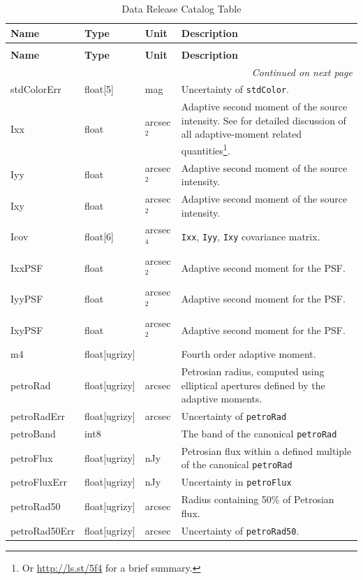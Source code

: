 \documentclass[SE,lsstdraft,toc]{lsstdoc}
\newenvironment{schema}[3]{%
\setlength\LTleft{0pt}
\setlength\LTright{\fill}
\begin{longtable}{p{0.2\textwidth}p{0.14\textwidth}p{0.14\textwidth}p{0.41\textwidth}}

\caption[#1]{#2\label{#3}}\\

\hline \textbf{Name} & \textbf{Type} & \textbf{Unit} & \textbf{Description}\\ \hline
\endfirsthead

\caption[#1]{#2}\\

\hline \textbf{Name} & \textbf{Type} & \textbf{Unit} & \textbf{Description}\\ \hline
\endhead

\hline \multicolumn{4}{r}{\emph{Continued on next page}} \\
\endfoot

\hline\hline
\endlastfoot
}{%
\hline
\end{longtable}
}
\begin{document}
\begin{schema}{\Object Table}{Data Release Catalog \Object Table}{tbl:objectTable}
stdColorErr & float[5] & mag & Uncertainty of \texttt{stdColor}. \\

Ixx & float & arcsec$^{2}$ & Adaptive second moment of the source intensity. See \citet{2002AJ....123..583B} for detailed discussion of all adaptive-moment related quantities\footnote{Or \url{http://ls.st/5f4} for a brief summary.}. \\

Iyy & float & arcsec$^{2}$ & Adaptive second moment of the source intensity. \\

Ixy & float & arcsec$^{2}$ & Adaptive second moment of the source intensity. \\

Icov & float[6] & arcsec$^{4}$ & \texttt{Ixx}, \texttt{Iyy}, \texttt{Ixy} covariance matrix. \\

IxxPSF & float & arcsec$^{2}$ & Adaptive second moment for the PSF. \\

IyyPSF & float & arcsec$^{2}$ & Adaptive second moment for the PSF. \\

IxyPSF & float & arcsec$^{2}$ & Adaptive second moment for the PSF. \\

m4 & float[ugrizy] & ~ & Fourth order adaptive moment. \\


petroRad & float[ugrizy] & arcsec & Petrosian radius, computed using elliptical apertures defined by the adaptive moments. \\

petroRadErr & float[ugrizy] & arcsec & Uncertainty of \texttt{petroRad} \\

petroBand & int8 & ~ & The band of the canonical \texttt{petroRad} \\

petroFlux & float[ugrizy] & nJy & Petrosian flux within a defined multiple of the canonical \texttt{petroRad} \\

petroFluxErr & float[ugrizy] & nJy & Uncertainty in \texttt{petroFlux} \\

petroRad50 & float[ugrizy] & arcsec & Radius containing 50\% of Petrosian flux. \\

petroRad50Err & float[ugrizy] & arcsec & Uncertainty of \texttt{petroRad50}. \\


\end{schema}
\end{document}
